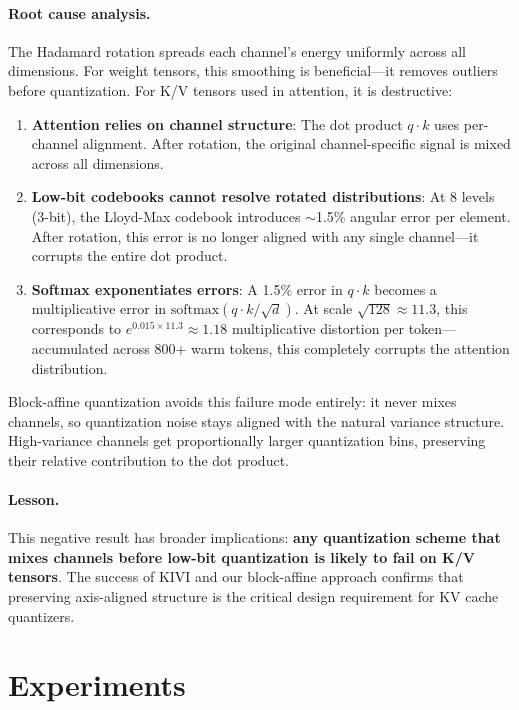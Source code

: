 \documentclass[11pt,a4paper]{article}
\begin{document}
\paragraph{Root cause analysis.} The Hadamard rotation spreads each channel's energy uniformly across all dimensions. For weight tensors, this smoothing is beneficial---it removes outliers before quantization. For K/V tensors used in attention, it is destructive:

\begin{enumerate}
    \item \textbf{Attention relies on channel structure}: The dot product $q \cdot k$ uses per-channel alignment. After rotation, the original channel-specific signal is mixed across all dimensions.
    \item \textbf{Low-bit codebooks cannot resolve rotated distributions}: At 8 levels (3-bit), the Lloyd-Max codebook introduces $\sim$1.5\% angular error per element. After rotation, this error is no longer aligned with any single channel---it corrupts the entire dot product.
    \item \textbf{Softmax exponentiates errors}: A 1.5\% error in $q \cdot k$ becomes a multiplicative error in $\text{softmax}(q \cdot k / \sqrt{d})$. At scale $\sqrt{128} \approx 11.3$, this corresponds to $e^{0.015 \times 11.3} \approx 1.18$ multiplicative distortion per token---accumulated across 800+ warm tokens, this completely corrupts the attention distribution.
\end{enumerate}

Block-affine quantization avoids this failure mode entirely: it never mixes channels, so quantization noise stays aligned with the natural variance structure. High-variance channels get proportionally larger quantization bins, preserving their relative contribution to the dot product.

\paragraph{Lesson.} This negative result has broader implications: \textbf{any quantization scheme that mixes channels before low-bit quantization is likely to fail on K/V tensors}. The success of KIVI and our block-affine approach confirms that preserving axis-aligned structure is the critical design requirement for KV cache quantizers.

\section{Experiments}
\label{sec:experiments}
\end{document}
